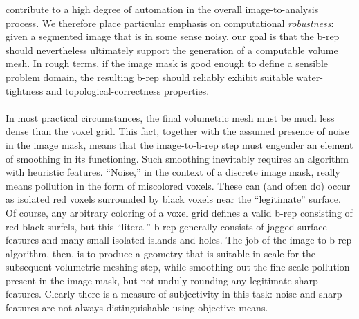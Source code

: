 contribute to a high degree of automation in the overall image-to-analysis process.  We therefore place particular emphasis on 
computational {\em robustness}:  given a segmented image that is in some sense noisy, our goal is that the b-rep should nevertheless ultimately support the generation of a computable volume mesh.  In rough terms, if the image mask is good enough to define a sensible problem domain, the resulting b-rep should reliably exhibit suitable water-tightness and topological-correctness properties. \\ \\
%
In most practical circumstances, the final volumetric mesh
must be much less dense than the voxel grid.  This fact, together with the assumed presence of noise in the image mask, means that the image-to-b-rep step must engender an element of smoothing in its functioning.  Such smoothing inevitably requires an algorithm with heuristic features.  ``Noise,'' in the context of a discrete image mask, really means pollution in the form of miscolored voxels.  These can (and often do) occur as isolated red voxels surrounded by black voxels near the ``legitimate'' surface.  Of course, any arbitrary coloring of a voxel grid defines a valid b-rep consisting of red-black surfels, but this ``literal'' b-rep generally consists of jagged surface features and many small isolated islands and holes.  The job of the image-to-b-rep algorithm, then, is to produce a geometry that is suitable in scale for the subsequent volumetric-meshing step, while smoothing out the fine-scale pollution present in the image mask, but not unduly rounding any legitimate sharp features.  Clearly there is a measure of subjectivity in this task:  noise and sharp features are not always distinguishable using objective means.
